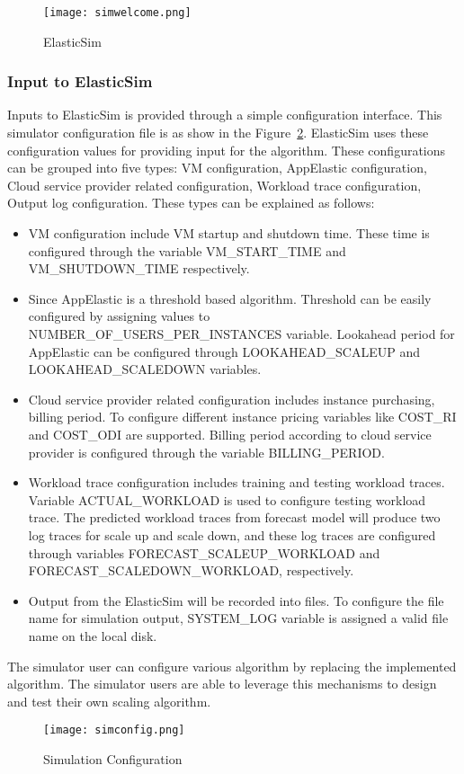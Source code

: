 \begin{figure}[h]
  \begin{center}
    \texttt{[image: simwelcome.png]}
    \caption{ElasticSim}
    \label{figure:simwelcome}
  \end{center}
\end{figure}

\subsubsection{Input to ElasticSim}
\label{subs:Input to ElasticSim}
Inputs to ElasticSim is provided through a simple configuration interface. This simulator configuration file is as show in the Figure~\ref{figure:simconfig}. ElasticSim uses these configuration values for providing input for the algorithm. These configurations can be grouped into five types: VM configuration, AppElastic configuration, Cloud service provider related configuration, Workload trace configuration, Output log configuration. These types can be explained as follows:

\begin{itemize}
  \item VM configuration include VM startup and shutdown time. These time is configured through the variable VM\_START\_TIME and VM\_SHUTDOWN\_TIME respectively.
  \item Since AppElastic is a threshold based algorithm. Threshold can be easily configured by assigning values to NUMBER\_OF\_USERS\_PER\_INSTANCES variable. Lookahead period for AppElastic can be configured through LOOKAHEAD\_SCALEUP and LOOKAHEAD\_SCALEDOWN variables.
  \item Cloud service provider related configuration includes instance purchasing, billing period. To configure different instance pricing variables like COST\_RI and COST\_ODI are supported. Billing period according to cloud service provider is configured through the variable BILLING\_PERIOD.
  \item Workload trace configuration includes training and testing workload traces. Variable ACTUAL\_WORKLOAD is used to configure testing workload trace. The predicted workload traces from forecast model will produce two log traces for scale up and scale down, and these log traces are configured through variables FORECAST\_SCALEUP\_WORKLOAD and FORECAST\_SCALEDOWN\_WORKLOAD, respectively.
  \item Output from the ElasticSim will be recorded into files. To configure the file name for simulation output, SYSTEM\_LOG variable is assigned a valid file name on the local disk.
\end{itemize}
The simulator user can configure various algorithm by replacing the implemented algorithm. The simulator users are able to leverage this mechanisms to design and test their own scaling algorithm.
\begin{figure}[h]
  \begin{center}
    \texttt{[image: simconfig.png]}
    \caption{Simulation Configuration}
    \label{figure:simconfig}
  \end{center}
\end{figure}


